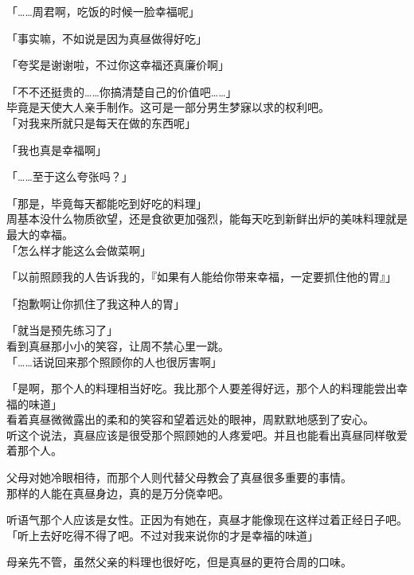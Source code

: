 「……周君啊，吃饭的时候一脸幸福呢」

「事实嘛，不如说是因为真昼做得好吃」

「夸奖是谢谢啦，不过你这幸福还真廉价啊」

「不不还挺贵的……你搞清楚自己的价值吧……」\\

毕竟是天使大人亲手制作。这可是一部分男生梦寐以求的权利吧。\\

「对我来所就只是每天在做的东西呢」

「我也真是幸福啊」

「……至于这么夸张吗？」

「那是，毕竟每天都能吃到好吃的料理」\\

周基本没什么物质欲望，还是食欲更加强烈，能每天吃到新鲜出炉的美味料理就是最大的幸福。\\

「怎么样才能这么会做菜啊」

「以前照顾我的人告诉我的，『如果有人能给你带来幸福，一定要抓住他的胃』」

「抱歉啊让你抓住了我这种人的胃」

「就当是预先练习了」\\

看到真昼那小小的笑容，让周不禁心里一跳。\\

「……话说回来那个照顾你的人也很厉害啊」

「是啊，那个人的料理相当好吃。我比那个人要差得好远，那个人的料理能尝出幸福的味道」\\

看着真昼微微露出的柔和的笑容和望着远处的眼神，周默默地感到了安心。\\

听这个说法，真昼应该是很受那个照顾她的人疼爱吧。并且也能看出真昼同样敬爱着那个人。

父母对她冷眼相待，而那个人则代替父母教会了真昼很多重要的事情。\\

那样的人能在真昼身边，真的是万分侥幸吧。

听语气那个人应该是女性。正因为有她在，真昼才能像现在这样过着正经日子吧。\\

「听上去好吃得不得了吧。不过对我来说你的才是幸福的味道」

母亲先不管，虽然父亲的料理也很好吃，但是真昼的更符合周的口味。\\

